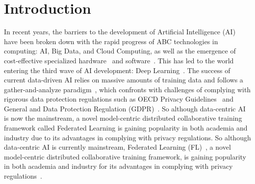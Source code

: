 \section{Introduction}


In recent years, the barriers to the development of Artificial Intelligence (AI) have been broken down with the rapid progress of ABC technologies in computing: AI, Big Data, and Cloud Computing, as well as the emergence of cost-effective specialized hardware~\cite{sze2017efficient} and software~\cite{jia2014caffe}. This has led to the world entering the third wave of AI development: Deep Learning~\cite{lecun2015deep}.
The success of current data-driven AI relies on massive amounts of training data and follows a gather-and-analyze paradigm~\cite{whang2023data}, which confronts with challenges of complying with rigorous data protection regulations such as OECD Privacy Guidelines~\cite{tene2011privacy} and General and Data Protection Regulation (GDPR)~\cite{voigt2017eu}.
So although data-centric AI is now the mainstream, a novel model-centric distributed collaborative training framework called Federated Learning is gaining popularity in both academia and industry due to its advantages in complying with privacy regulations.
So although data-centric AI is currently mainstream, Federated Learning (FL)~\cite{li2020federated}, a novel model-centric distributed collaborative training framework, is gaining popularity in both academia and industry for its advantages in complying with privacy regulations~\cite{truong2021privacy}.

